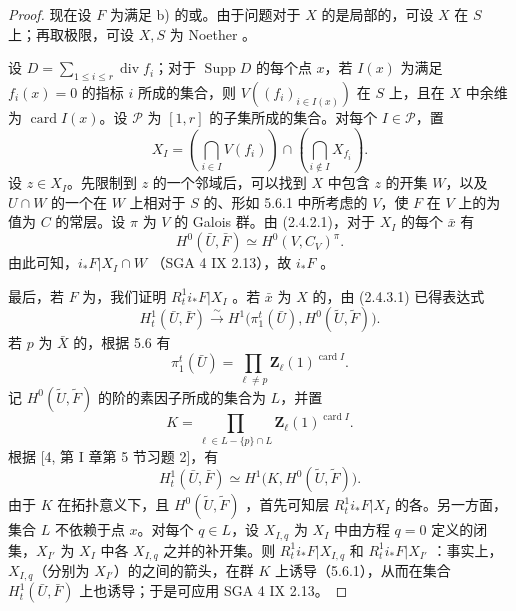 \begin{proof}
现在设 $F$ 为满足 b) 的或。由于问题对于 $X$ 的是局部的，可设 $X$ 在 $S$ 上；再取极限，可设 $X,S$ 为 Noether 。

设 $D=\sum_{1\leqslant i\leqslant r}\operatorname{div}f_i$；对于 $\operatorname{Supp}D$ 的每个点 $x$，若 $I(x)$ 为满足 $f_i(x)=0$ 的指标 $i$ 所成的集合，则 $V((f_i)_{i\in I(x)})$ 在 $S$ 上，且在 $X$ 中余维为 $\operatorname{card}I(x)$。设 $\mathcal P$ 为 $[1,r]$ 的子集所成的集合。对每个 $I\in\mathcal P$，置
\[X_I=\left(\bigcap_{i\in I}V(f_i)\right)\cap\left(\bigcap_{i\notin I}X_{f_i}\right).\]
设 $z\in X_I$。先限制到 $z$ 的一个邻域后，可以找到 $X$ 中包含 $z$ 的开集 $W$，以及 $U\cap W$ 的一个在 $W$ 上相对于 $S$ 的、形如 5.6.1 中所考虑的 $V$，使 $F$ 在 $V$ 上的为值为 $C$ 的常层。设 $\pi$ 为 $V$ 的 Galois 群。由 (2.4.2.1)，对于 $X_I$ 的每个 $\bar x$ 有
\[H^0(\bar U,\bar F)\simeq H^0(V,C_V)^\pi.\]
由此可知，$i_*F|X_I\cap W$ （SGA 4 IX 2.13），故 $i_*F$ 。

最后，若 $F$ 为，我们证明 $R^1_ti_*F|X_I$ 。若 $\bar x$ 为 $X$ 的，由 (2.4.3.1) 已得表达式
\[H^1_t(\bar U,\bar F)\xrightarrow{\sim}H^1\bigl(\pi_1^t(\bar U),H^0(\widetilde U,\widetilde F)\bigr).\]
若 $p$ 为 $\bar X$ 的，根据 5.6 有
\[\pi_1^t(\bar U)=\prod_{\ell\ne p}\mathbf Z_\ell(1)^{\operatorname{card}I}.\]
记 $H^0(\widetilde U,\widetilde F)$ 的阶的素因子所成的集合为 $L$，并置
\[K=\prod_{\ell\in L-\{p\}\cap L}\mathbf Z_\ell(1)^{\operatorname{card}I}.\]
根据 [4, 第 I 章第 5 节习题 2]，有
\[H^1_t(\bar U,\bar F)\simeq H^1\bigl(K,H^0(\widetilde U,\widetilde F)\bigr).\]
由于 $K$ 在拓扑意义下，且 $H^0(\widetilde U,\widetilde F)$ ，首先可知层 $R^1_ti_*F|X_I$ 的各。另一方面，集合 $L$ 不依赖于点 $x$。对每个 $q\in L$，设 $X_{I,q}$ 为 $X_I$ 中由方程 $q=0$ 定义的闭集，$X_{I'}$ 为 $X_I$ 中各 $X_{I,q}$ 之并的补开集。则 $R^1_ti_*F|X_{I,q}$ 和 $R^1_ti_*F|X_{I'}$ ：事实上，$X_{I,q}$（分别为 $X_{I'}$）的之间的箭头，在群 $K$ 上诱导（5.6.1），从而在集合 $H^1_t(\bar U,\bar F)$ 上也诱导；于是可应用 SGA 4 IX 2.13。
\end{proof}

